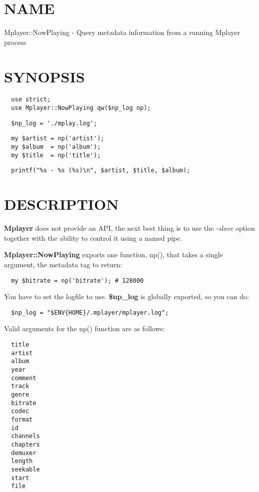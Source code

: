 \section{NAME\label{NAME}}


Mplayer::NowPlaying - Query metadata information from a running Mplayer process

\section{SYNOPSIS\label{SYNOPSIS}}
\begin{verbatim}
  use strict;
  use Mplayer::NowPlaying qw($np_log np);
\end{verbatim}
\begin{verbatim}
  $np_log = './mplay.log';
\end{verbatim}
\begin{verbatim}
  my $artist = np('artist');
  my $album  = np('album');
  my $title  = np('title');
\end{verbatim}
\begin{verbatim}
  printf("%s - %s (%s)\n", $artist, $title, $album);
\end{verbatim}
\section{DESCRIPTION\label{DESCRIPTION}}


\textbf{Mplayer} does not provide an API, the next best thing is to use the \textit{-slave} option
together with the ability to control it using a named pipe.



\textbf{Mplayer::NowPlaying} exports one function, np(), that takes a single argument,
the metadata tag to return:

\begin{verbatim}
  my $bitrate = np('bitrate'); # 128000
\end{verbatim}


You have to set the logfile to use. \textbf{\$np\_log} is globally exported, so you can do:

\begin{verbatim}
  $np_log = "$ENV{HOME}/.mplayer/mplayer.log";
\end{verbatim}


Valid arguments for the np() function are as follows:

\begin{verbatim}
  title
  artist
  album
  year
  comment
  track
  genre
  bitrate
  codec
  format
  id
  channels
  chapters
  demuxer
  length
  seekable
  start
  file
\end{verbatim}
